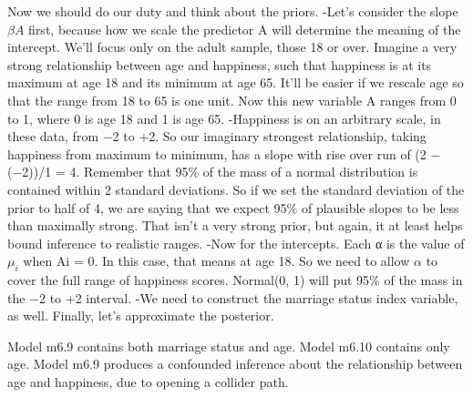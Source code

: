 \documentclass[
]{article}
\newenvironment{Shaded}{\begin{snugshade}}{\end{snugshade}}
\newcommand{\CommentTok}[1]{\textcolor[rgb]{0.56,0.35,0.01}{\textit{#1}}}
\newcommand{\DataTypeTok}[1]{\textcolor[rgb]{0.13,0.29,0.53}{#1}}
\newcommand{\DecValTok}[1]{\textcolor[rgb]{0.00,0.00,0.81}{#1}}
\newcommand{\KeywordTok}[1]{\textcolor[rgb]{0.13,0.29,0.53}{\textbf{#1}}}
\newcommand{\NormalTok}[1]{#1}
\newcommand{\OperatorTok}[1]{\textcolor[rgb]{0.81,0.36,0.00}{\textbf{#1}}}
\newcommand{\StringTok}[1]{\textcolor[rgb]{0.31,0.60,0.02}{#1}}
\begin{document}
Now we should do our duty and think about the priors. -Let's consider
the slope \(\beta A\) first, because how we scale the predictor A will
determine the meaning of the intercept. We'll focus only on the adult
sample, those 18 or over. Imagine a very strong relationship between age
and happiness, such that happiness is at its maximum at age 18 and its
minimum at age 65. It'll be easier if we rescale age so that the range
from 18 to 65 is one unit. Now this new variable A ranges from 0 to 1,
where 0 is age 18 and 1 is age 65. -Happiness is on an arbitrary scale,
in these data, from −2 to +2. So our imaginary strongest relationship,
taking happiness from maximum to minimum, has a slope with rise over run
of (2 − (−2))/1 = 4. Remember that 95\% of the mass of a normal
distribution is contained within 2 standard deviations. So if we set the
standard deviation of the prior to half of 4, we are saying that we
expect 95\% of plausible slopes to be less than maximally strong. That
isn't a very strong prior, but again, it at least helps bound inference
to realistic ranges. -Now for the intercepts. Each α is the value of
\(\mu_i\) when Ai = 0. In this case, that means at age 18. So we need to
allow \(\alpha\) to cover the full range of happiness scores. Normal(0,
1) will put 95\% of the mass in the −2 to +2 interval. -We need to
construct the marriage status index variable, as well. Finally, let's
approximate the posterior.

\begin{Shaded}
\end{Shaded}

Model m6.9 contains both marriage status and age. Model m6.10 contains
only age. Model m6.9 produces a confounded inference about the
relationship between age and happiness, due to opening a collider path.
\end{document}
